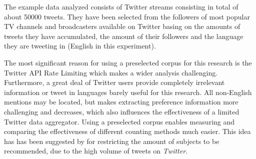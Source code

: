The example data analyzed consists of Twitter streams consisting in total of about 50000 tweets. They have been selected from the followers of most popular TV channels and broadcasters available on Twitter basing on the amounts of tweets they have accumulated, the amount of their followers and the language they are tweeting in (English in this experiment).

The most significant reason for using a preselected corpus for this research is the Twitter API Rate Limiting
which makes a wider analysis challenging. Furthermore, a great deal of Twitter users provide completely irrelevant
information or tweet in languages barely useful for this research. All non-English mentions may be located,
but makes extracting preference information more challenging and decreases, which also
influences the effectiveness of a limited Twitter data aggregator. Using a preselected corpus enables measuring and comparing the effectiveness of different counting methods much easier. This idea has has been suggested by \cite{short-tweet} for
restricting the amount of subjects to be recommended, due to the high volume of tweets on \textit{Twitter}.